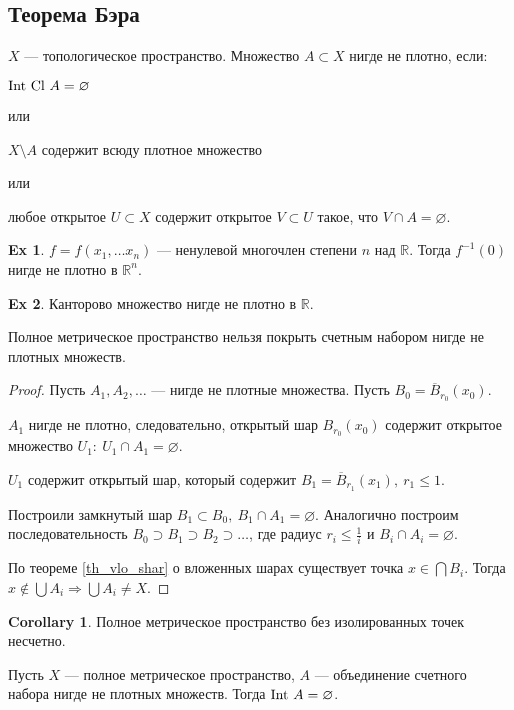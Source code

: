 \documentclass[11pt]{book}
\newcommand{\R}{\mathbb{R}}
\newcommand{\Cl}{{\mathop{\text{\rm Cl}}}~}
\newcommand{\Int}{{\mathop{\text{\rm Int}}}~}
\renewcommand{\le}{\leqslant}
\theoremstyle{definition}
\theoremstyle{plain}
\theoremstyle{plain}
\theoremstyle{definition}
\newtheorem*{ex}{Ex}
\newtheorem*{cor}{Corollary}
\theoremstyle{remark}
\begin{document}
\subsection{Теорема Бэра}
\begin{defn}
    $ X$ ---  топологическое пространство. Множество $ A \subset X$ нигде не плотно, если:
    \begin{description}
	\item $ \Int \Cl A = \varnothing$
    \end{description}
    или
    \begin{description}
	\item $X \setminus A$ содержит всюду плотное множество
    \end{description}
    или
    \begin{description}
	\item любое открытое $ U \subset X$ содержит  открытое $ V \subset U$ такое, что $ V \cap A = \varnothing$.
    \end{description}
\end{defn}
\begin{ex}
    $ f = f(x_1, \ldots x_n)$ --- ненулевой многочлен степени $ n$ над  $ \R$. Тогда  $ f^{-1}(0)$ нигде не плотно в $ \R^{n} $.
\end{ex}
\begin{ex}
    Канторово множество нигде не плотно в $ \R$.
\end{ex}
\begin{thm}[Бэр]
    Полное метрическое пространство нельзя покрыть счетным набором нигде не плотных множеств.
\end{thm}
\begin{proof}
    Пусть $ A_1, A_2, \ldots $ --- нигде не плотные множества.
    Пусть $ B_0 = \overline{B}_{r_0}(x_0)$.

    $ A_1$ нигде не плотно, следовательно, открытый шар $ B_{r_0}(x_0)$ содержит открытое множество $ U_1: ~ U_1 \cap A_1 = \varnothing$.

    $ U_1$ содержит открытый шар, который содержит $ B_1 = \overline{B}_{r_1}(x_1), ~ r_1 \le  1$. 

    Построили замкнутый шар $ B_1 \subset B_0, ~ B_1 \cap A_1 = \varnothing$.
    Аналогично построим последовательность $ B_0 \supset B_1 \supset B_2 \supset \ldots $, где радиус $  r_i \le \frac{1}{i}$ и $ B_i \cap A_i = \varnothing$.

    По теореме \ref{th_vlo_shar} о вложенных шарах существует точка $ x \in  \bigcap B_i $. Тогда $ x \not\in \bigcup A_i  \Longrightarrow  \bigcup A_i \ne X$.
\end{proof}
\begin{cor}
    Полное метрическое пространство без изолированных точек несчетно.
\end{cor}
\begin{thm}
    Пусть $ X$ --- полное метрическое пространство,  $ A$ --- объединение счетного набора нигде не плотных множеств. Тогда  $ \Int A = \varnothing$.
\end{thm}
\end{document}
